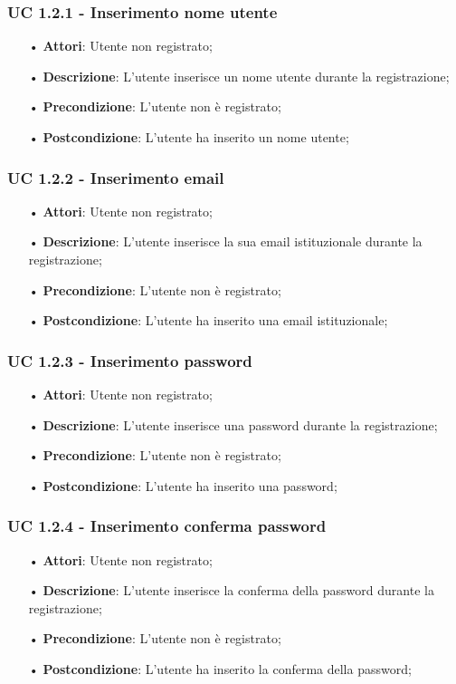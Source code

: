 \subsubsection{UC 1.2.1 - Inserimento nome utente}
\begin{itemize}
	\item[•]\textbf{Attori}: Utente non registrato;
	\item[•]\textbf{Descrizione}: L'utente inserisce un nome utente durante la registrazione;
	\item[•]\textbf{Precondizione}: L'utente non è registrato;
	\item[•]\textbf{Postcondizione}: L'utente ha inserito un nome utente;
\end{itemize}

\subsubsection{UC 1.2.2 - Inserimento email}
\begin{itemize}
	\item[•]\textbf{Attori}: Utente non registrato;
	\item[•]\textbf{Descrizione}: L'utente inserisce la sua email istituzionale durante la registrazione;
	\item[•]\textbf{Precondizione}: L'utente non è registrato;
	\item[•]\textbf{Postcondizione}: L'utente ha inserito una email istituzionale;
\end{itemize}

\subsubsection{UC 1.2.3 - Inserimento password}
\begin{itemize}
	\item[•]\textbf{Attori}: Utente non registrato;
	\item[•]\textbf{Descrizione}: L'utente inserisce una password durante la registrazione;
	\item[•]\textbf{Precondizione}: L'utente non è registrato;
	\item[•]\textbf{Postcondizione}: L'utente ha inserito una password;
\end{itemize}

\subsubsection{UC 1.2.4 - Inserimento conferma password}
\begin{itemize}
	\item[•]\textbf{Attori}: Utente non registrato;
	\item[•]\textbf{Descrizione}: L'utente inserisce la conferma della password durante la registrazione;
	\item[•]\textbf{Precondizione}: L'utente non è registrato;
	\item[•]\textbf{Postcondizione}: L'utente ha inserito la conferma della password;
\end{itemize}

